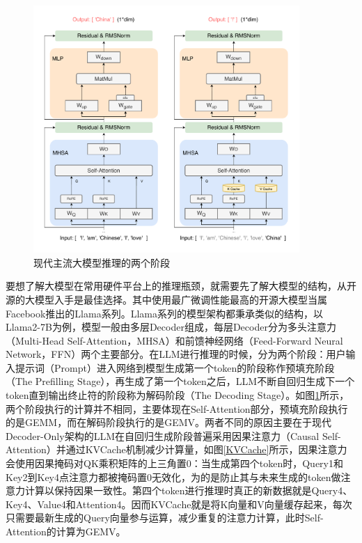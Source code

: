 \begin{figure}[!htbp]
	\centering
    \includegraphics[width=0.9\textwidth]{figures/LLMInfer.pdf}
	\caption{现代主流大模型推理的两个阶段}
    \label{LLMInfer}
\end{figure}

要想了解大模型在常用硬件平台上的推理瓶颈，就需要先了解大模型的结构，从开源的大模型入手是最佳选择。其中使用最广微调性能最高的开源大模型当属Facebook推出的Llama系列。Llama系列的模型架构都秉承类似的结构，以Llama2-7B\cite{Llama2}为例，模型一般由多层Decoder组成，每层Decoder分为多头注意力（Multi-Head Self-Attention，MHSA）和前馈神经网络（Feed-Forward Neural Network，FFN）两个主要部分。在LLM进行推理的时候，分为两个阶段：用户输入提示词（Prompt）进入网络到模型生成第一个token的阶段称作预填充阶段（The Prefilling Stage），再生成了第一个token之后，LLM不断自回归生成下一个token直到输出终止符的阶段称为解码阶段（The Decoding Stage）。如图\ref{LLMInfer}所示，两个阶段执行的计算并不相同，主要体现在Self-Attention部分，预填充阶段执行的是GEMM，而在解码阶段执行的是GEMV。两者不同的原因主要在于现代Decoder-Only架构的LLM在自回归生成阶段普遍采用因果注意力（Causal Self-Attention）并通过KVCache机制减少计算量，如图\ref{KVCache}所示，因果注意力会使用因果掩码对QK乘积矩阵的上三角置0：当生成第四个token时，Query1和Key2到Key4点注意力都被掩码置0无效化，为的是防止其与未来生成的token做注意力计算以保持因果一致性。第四个token进行推理时真正的新数据就是Query4、Key4、Value4和Attention4。因而KVCache就是将K向量和V向量缓存起来，每次只需要最新生成的Query向量参与运算，减少重复的注意力计算，此时Self-Attention的计算为GEMV。

